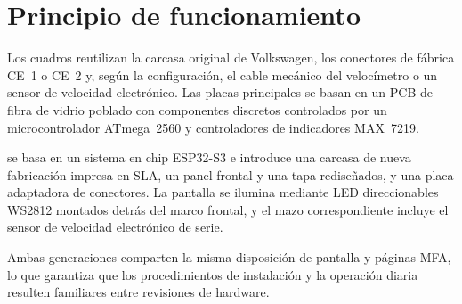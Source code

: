 \chapter{Principio de funcionamiento} \label{ch:operating-principle}

Los cuadros \ReplicaGenOne{} reutilizan la carcasa original de Volkswagen, los conectores de fábrica CE~1 o CE~2 y, según la configuración, el cable mecánico del velocímetro o un sensor de velocidad electrónico.
Las placas principales \ReplicaGenOneShort{} se basan en un PCB de fibra de vidrio poblado con componentes discretos controlados por un microcontrolador ATmega~2560 y controladores de indicadores MAX~7219.

\ReplicaNextLong{} se basa en un sistema en chip ESP32-S3 e introduce una carcasa de nueva fabricación impresa en SLA, un panel frontal y una tapa rediseñados, y una placa adaptadora de conectores.
La pantalla \ReplicaNextShort{} se ilumina mediante LED direccionables WS2812 montados detrás del marco frontal, y el mazo correspondiente incluye el sensor de velocidad electrónico de serie.

Ambas generaciones comparten la misma disposición de pantalla y páginas MFA, lo que garantiza que los procedimientos de instalación y la operación diaria resulten familiares entre revisiones de hardware.
